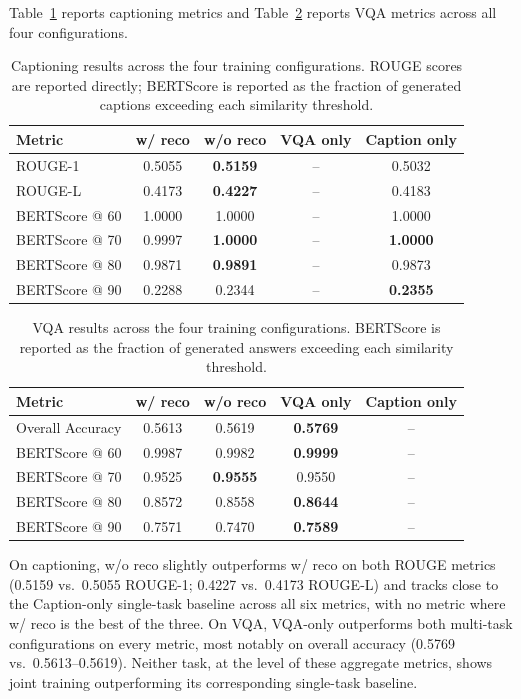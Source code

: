 Table~\ref{tab:chap6_captioning} reports captioning metrics and
Table~\ref{tab:chap6_vqa} reports VQA metrics across all four
configurations.

\begin{table}[ht]
\centering
\small
\caption{Captioning results across the four training configurations.
ROUGE scores are reported directly; BERTScore is reported as the
fraction of generated captions exceeding each similarity threshold.}
\label{tab:chap6_captioning}
\begin{tabular}{lcccc}
\toprule
\textbf{Metric} & \textbf{w/ reco} & \textbf{w/o reco} & \textbf{VQA only} & \textbf{Caption only} \\
\midrule
ROUGE-1 & 0.5055 & \textbf{0.5159} & -- & 0.5032 \\
ROUGE-L & 0.4173 & \textbf{0.4227} & -- & 0.4183 \\
BERTScore @ 60 & 1.0000 & 1.0000 & -- & 1.0000 \\
BERTScore @ 70 & 0.9997 & \textbf{1.0000} & -- & \textbf{1.0000} \\
BERTScore @ 80 & 0.9871 & \textbf{0.9891} & -- & 0.9873 \\
BERTScore @ 90 & 0.2288 & 0.2344 & -- & \textbf{0.2355} \\
\bottomrule
\end{tabular}
\end{table}

\begin{table}[ht]
\centering
\small
\caption{VQA results across the four training configurations.
BERTScore is reported as the fraction of generated answers exceeding
each similarity threshold.}
\label{tab:chap6_vqa}
\begin{tabular}{lcccc}
\toprule
\textbf{Metric} & \textbf{w/ reco} & \textbf{w/o reco} & \textbf{VQA only} & \textbf{Caption only} \\
\midrule
Overall Accuracy & 0.5613 & 0.5619 & \textbf{0.5769} & -- \\
BERTScore @ 60 & 0.9987 & 0.9982 & \textbf{0.9999} & -- \\
BERTScore @ 70 & 0.9525 & \textbf{0.9555} & 0.9550 & -- \\
BERTScore @ 80 & 0.8572 & 0.8558 & \textbf{0.8644} & -- \\
BERTScore @ 90 & 0.7571 & 0.7470 & \textbf{0.7589} & -- \\
\bottomrule
\end{tabular}
\end{table}

On captioning, w/o reco slightly outperforms w/ reco on both ROUGE
metrics (0.5159 vs.\ 0.5055 ROUGE-1; 0.4227 vs.\ 0.4173 ROUGE-L) and
tracks close to the Caption-only single-task baseline across all six
metrics, with no metric where w/ reco is the best of the three. On
VQA, VQA-only outperforms both multi-task configurations on every
metric, most notably on overall accuracy (0.5769 vs.\ 0.5613--0.5619).
Neither task, at the level of these aggregate metrics, shows joint
training outperforming its corresponding single-task baseline.

